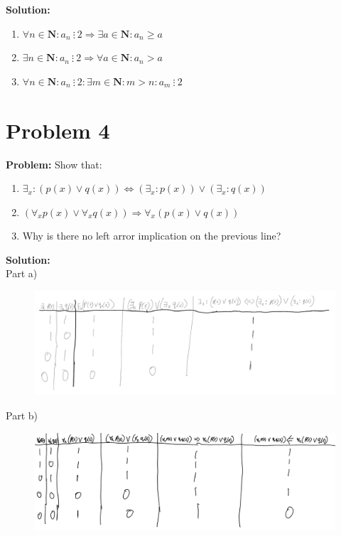 \documentclass[]{article}
\begin{document}
\textbf{Solution:}

\begin{enumerate}
	\item $\forall n \in \mathbf{N} : a_n \ \vdots \ 2 \Rightarrow \exists a \in \mathbf{N} : a_n \geq a$
	\item $\exists n \in \mathbf{N} : a_n \ \vdots \ 2 \Rightarrow \forall a \in \mathbf{N} : a_n > a$
	\item $\forall n \in \mathbf{N} : a_n \ \vdots \ 2 : \exists m \in \mathbf{N} : m > n : a_m \ \vdots \ 2$
\end{enumerate}

\newpage
\section{Problem 4}
\textbf{Problem:}
Show that:
\begin{enumerate}
	\item $\exists_x : (p(x) \lor q(x)) \iff (\exists_x : p(x)) \lor (\exists_x : q(x))$
	\item $(\forall_x p(x) \lor \forall_x q(x)) \Rightarrow \forall_x (p(x) \lor q(x))$
	\item Why is there no left arror implication on the previous line?
\end{enumerate}

\textbf{Solution:}\\
Part a)
\begin{figure}[h]
	\centering
	\includegraphics[width = \textwidth]{fig/pblm4a.png}
\end{figure}

Part b)
\begin{figure}[h]
	\centering
	\includegraphics[width = \textwidth]{fig/pblm4b.png}
\end{figure}
\end{document}
